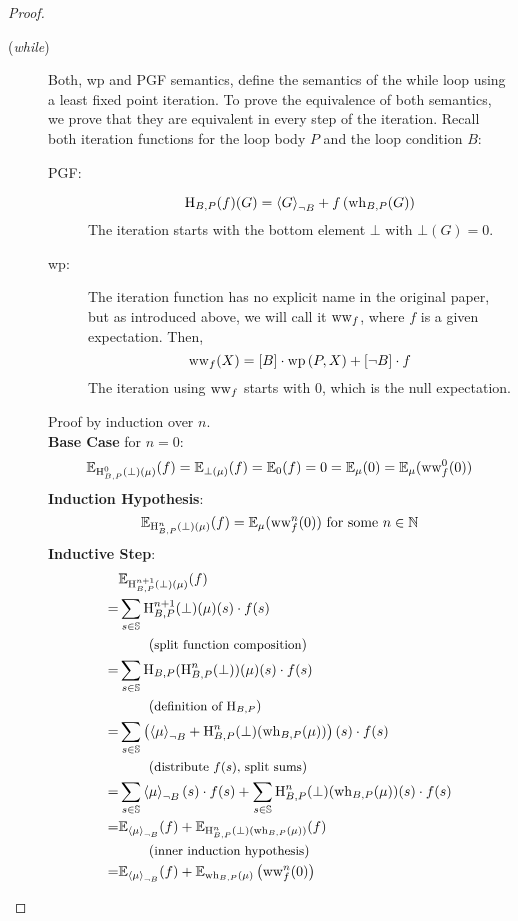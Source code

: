 \begin{theorem}
\begin{proof}
\begin{description}
			\item[(\textit{while})] Both, wp and PGF semantics, define the semantics of the while loop using a least	
				fixed point iteration.
				To prove the equivalence of both semantics, we prove that they are equivalent in every step of the iteration.
				Recall both iteration functions for the loop body $P$ and the loop condition $B$:
				\begin{description}
					\item[PGF:] \[ \operatorname{H}_{B, P}(f)(G) = \left\langle G \right\rangle_{\lnot B} + f \left( \operatorname{wh}_{B, P}(G) \right) \]
						The iteration starts with the bottom element $\bot$ with $\bot(G) = 0$.
					\item[wp:] The iteration function has no explicit name in the original paper, but as introduced above, we will call it $\operatorname{ww}_f$, where $f$ is a given expectation.
						Then, \[ \operatorname{ww}_f(X) = [B] \cdot \operatorname{wp}\left( P, X \right) + [\lnot B] \cdot f \]
						The iteration using $\operatorname{ww}_f$ starts with $0$, which is the null expectation.
				\end{description}
				Proof by induction over $n$. \\
				\textbf{Base Case} for $n = 0$:
				\begin{align*}
					\mathbb{E}_{ \operatorname{H}_{B, P}^0(\bot)(\mu) }(f) = \mathbb{E}_{ \bot(\mu) } (f) = \mathbb{E}_0(f) = 0 = \mathbb{E}_\mu(0) = \mathbb{E}_\mu (\operatorname{ww}_f^0(0))
				\end{align*}
				\textbf{Induction Hypothesis}:
				$$ \mathbb{E}_{ \operatorname{H}_{B, P}^n(\bot)(\mu) } (f) = \mathbb{E}_\mu (\operatorname{ww}_f^n(0)) \text{ for some } n \in \mathbb{N} $$
				\textbf{Inductive Step}:
				\begin{align*}
				  & \E_{ \hh^{n+1}(\bot)(\mu) } (f) \\
				= & \sum_{s \in \S} \hh^{n+1}(\bot)(\mu)(s) \cdot f(s) \\
				  & \explain{split function composition} \\
				= & \sum_{s \in \S} \hh(\hh^n(\bot))(\mu)(s) \cdot f(s) \\
				  & \explain{definition of $\hh$} \\
				= & \sum_{s \in \S} \l( \resN{\mu}
					+ \hh^n(\bot)(\wh(\mu)) \r)(s) \cdot f(s) \\
				  & \explain{distribute $f(s)$, split sums} \\
				= & \sum_{s \in \S} \resN{\mu}(s) \cdot f(s)
					+ \sum_{s \in \S} \hh^n(\bot)(\wh(\mu))(s) \cdot f(s) \\
				= & \E_{\resN{\mu}} (f) + \E_{ \hh^n(\bot)(\wh(\mu)) } (f) \\
				  & \explain{inner induction hypothesis} \\
				= & \E_{ \resN{\mu} } (f) + \E_{ \wh(\mu) } \l( \ww^n (0) \r) \\

\end{align*}
\end{description}
\end{proof}
\end{theorem}
